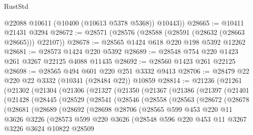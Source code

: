 \begin{lexlean}{RustStd}
\begin{coremodule}
        @22088
        @10611
        (@10400 (@10613 @5378 @5368))
        @10443))
@28665 := @10411 @21431 @3294
@28672 := @28571 (@28576 (@28588 (@28591 (@28632 (@28663 @28665))) @22107))
@28678 := @28565 @1424 @618 @220 @198 @5392 @12262
@28681 := @28573 @1424 @220 @5392
@28689 := @28548 @754 @220 @1423 @261 @3267 @22125 @4088 @11435
@28692 := @28560 @1423 @261 @22125
@28698 := @28565 @494 @601 @220 @251 @3332 @9413
@28706 := @28479 @22 @220 @22 @3332 (@10341 (@28484 @22)) @10859
@28814 := @21236
    (@21261
      (@21302
        (@21304
          (@21306
            (@21327
              (@21350
                (@21367
                  (@21386
                    (@21397
                      (@21401
                        (@21428
                          (@28445
                            (@28529
                              (@28541
                                (@28546
                                  (@28558
                                    (@28563
                                      (@28672
                                        (@28678
                                          (@28681
                                            (@28689
                                              (@28692
                                                (@28698
                                                  @28706
                                                  (@28565
                                                    @599
                                                    @453
                                                    @220
                                                    @11
                                                    @3626
                                                    @3226
                                                    (@28573
                                                      @599
                                                      @220
                                                      @3626
                                                      (@28548
                                                        @596
                                                        @220
                                                        @453
                                                        @11
                                                        @3267
                                                        @3226
                                                        @3624
                                                        @10822
                                                        @28509

\end{coremodule}
\end{lexlean}

